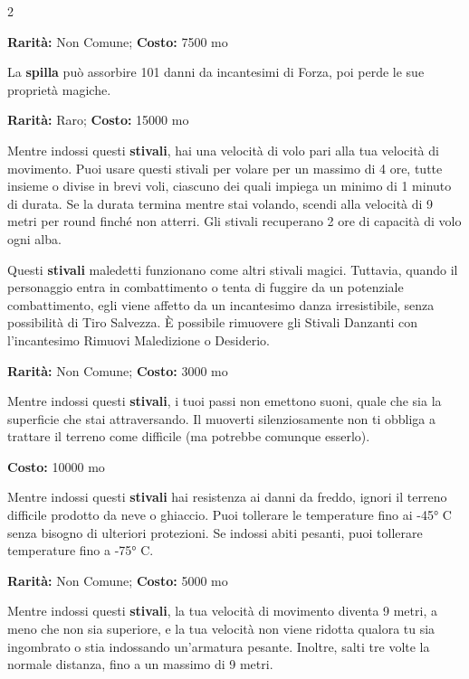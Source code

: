 \begin{multicols}{2}

\textbf{Rarità:} Non Comune; \textbf{Costo:} 7500 mo

La \textbf{spilla} può assorbire 101 danni da incantesimi di Forza, poi perde le sue proprietà magiche.


\textbf{Rarità:} Raro; \textbf{Costo:} 15000 mo

Mentre indossi questi \textbf{stivali}, hai una velocità di volo pari alla tua velocità di movimento. Puoi usare questi stivali per volare per un massimo di 4 ore, tutte insieme o divise in brevi voli, ciascuno dei quali impiega un minimo di 1 minuto di durata. Se la durata termina mentre stai volando, scendi alla velocità di 9 metri per round finché non atterri. Gli stivali recuperano 2 ore di capacità di volo ogni alba.


Questi \textbf{stivali} maledetti funzionano come altri stivali magici. Tuttavia, quando il personaggio entra in combattimento o tenta di fuggire da un potenziale combattimento, egli viene affetto da un incantesimo danza irresistibile, senza possibilità di Tiro Salvezza. È possibile rimuovere gli Stivali Danzanti con l'incantesimo Rimuovi Maledizione o Desiderio.


\textbf{Rarità:} Non Comune; \textbf{Costo:} 3000 mo

Mentre indossi questi \textbf{stivali}, i tuoi passi non emettono suoni, quale che sia la superficie che stai attraversando. Il muoverti silenziosamente non ti obbliga a trattare il terreno come difficile (ma potrebbe comunque esserlo).


\textbf{Costo:} 10000 mo

Mentre indossi questi \textbf{stivali} hai resistenza ai danni da freddo, ignori il terreno difficile prodotto da neve o ghiaccio. Puoi tollerare le temperature fino ai -45° C senza bisogno di ulteriori protezioni. Se indossi abiti pesanti, puoi tollerare temperature fino a -75° C.


\textbf{Rarità:} Non Comune; \textbf{Costo:} 5000 mo

Mentre indossi questi \textbf{stivali}, la tua velocità di movimento diventa 9 metri, a meno che non sia superiore, e la tua velocità non viene ridotta qualora tu sia ingombrato o stia indossando un'armatura pesante. Inoltre, salti tre volte la normale distanza, fino a un massimo di 9 metri.


\end{multicols}
